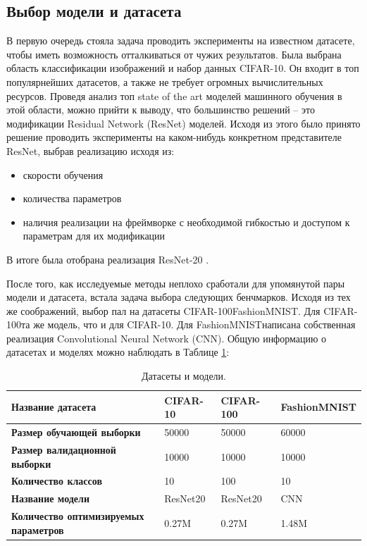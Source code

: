 \documentclass[a4paper,article,14pt]{extarticle}
\begin{document}
\subsection{Выбор модели и датасета}
В первую очередь стояла задача проводить эксперименты на известном датасете, чтобы иметь возможность отталкиваться от чужих результатов. Была выбрана область классификации изображений и набор данных \flqq CIFAR-10\frqq. Он входит в топ популярнейших датасетов, а также не требует огромных вычислительных ресурсов. Проведя анализ топ state of the art моделей машинного обучения в этой области, можно прийти к выводу, что большинство решений -- это модификации Residual Network (ResNet) моделей. Исходя из этого было принято решение проводить эксперименты на каком-нибудь конкретном представителе ResNet, выбрав реализацию исходя из:
\begin{itemize}
    \item скорости обучения
    \item количества параметров
    \item наличия реализации на фреймворке с необходимой гибкостью и доступом к параметрам для их модификации
\end{itemize}

В итоге была отобрана реализация ResNet-20 \cite{github_resnet}.

После того, как исследуемые методы неплохо сработали для упомянутой пары модели и датасета, встала задача выбора следующих бенчмарков. Исходя из тех же соображений, выбор пал на датасеты \flqq CIFAR-100\frqq{} \flqq FashionMNIST\frqq. Для \flqq CIFAR-100\frqq{} та же модель, что и для \flqq CIFAR-10\frqq. Для \flqq FashionMNIST\frqq{} написана собственная реализация Convolutional Neural Network (CNN). Общую информацию о датасетах и моделях можно наблюдать в Таблице \ref{table:datasets}:


\begin{center}
    \begin{longtable}{|p{5cm}|p{3cm}|p{3cm}|p{3cm}|}
    \caption{Датасеты и модели.}
    \label{table:datasets}\\
    \hline
    \textbf{Название датасета} & CIFAR-10  & CIFAR-100 & FashionMNIST\\
    \hline
    \textbf{Размер обучающей выборки} & 50000 & 50000 & 60000\\
    \hline
    \textbf{Размер валидационной выборки} & 10000 & 10000 & 10000\\
    \hline
    \textbf{Количество классов} & 10 & 100 & 10\\
    \hline
    \textbf{Название модели} & ResNet20 & ResNet20 & CNN\\
    \hline
    \textbf{Количество оптимизируемых параметров} & 0.27M & 0.27M & 1.48M\\
    \hline
    \end{longtable}
\end{center}
\end{document}
